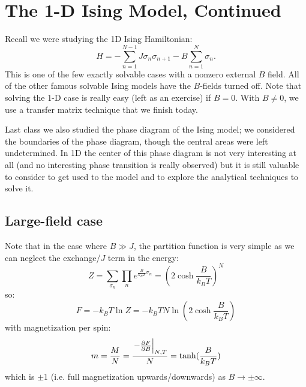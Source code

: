 \section{The 1-D Ising Model, Continued}
Recall we were studying the 1D Ising Hamiltonian:
\begin{equation}
    H = -\sum_{n=1}^{N-1}J\sigma_n \sigma_{n+1} - B \sum_{n=1}^N \sigma_n.
\end{equation}
This is one of the few exactly solvable cases with a nonzero external $B$ field. All of the other famous solvable Ising models have the $B$-fields turned off. Note that solving the 1-D case is really easy (left as an exercise) if $B = 0$. With $B \neq 0$, we use a transfer matrix technique that we finish today.

Last class we also studied the phase diagram of the Ising model; we considered the boundaries of the phase diagram, though the central areas were left undetermined. In 1D the center of this phase diagram is not very interesting at all (and no interesting phase transition is really observed) but it is still valuable to consider to get used to the model and to explore the analytical techniques to solve it.

\subsection{Large-field case}

Note that in the case where $B \gg J$, the partition function is very simple as we can neglect the exchange/$J$ term in the energy:
\begin{equation}
    Z = \sum_{\sigma_n} \prod_n e^{\frac{B}{k_B T}\sigma_n} = \left(2\cosh\frac{B}{k_B T}\right)^N
\end{equation}
so:
\begin{equation}
    F = -k_B T \ln Z = -k_B T N \ln (2\cosh\frac{B}{k_B T})
\end{equation}
with magnetization per spin:
\begin{equation}
    m = \frac{M}{N} =  \frac{\left.-\frac{\partial F}{\partial B}\right|_{N, T}}{N} = \tanh(\frac{B}{k_B T})
\end{equation}
which is $\pm 1$ (i.e. full magnetization upwards/downwards) as $B \to \pm \infty$. 

